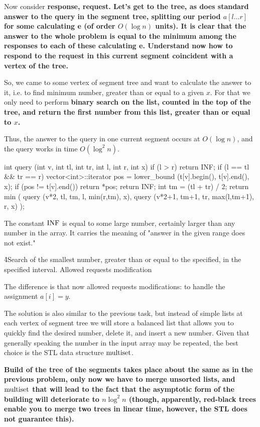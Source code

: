 Now consider \bf{response, request}. Let's get to the tree, as does standard answer to the query in the segment tree, splitting our period $a[l \ldots r]$ for some calculating e (of order $O (\log n)$ units). It is clear that the answer to the whole problem is equal to the minimum among the responses to each of these calculating e. Understand now how to respond to the request in this current segment coincident with a vertex of the tree.

So, we came to some vertex of segment tree and want to calculate the answer to it, i.e. to find minimum number, greater than or equal to a given $x$. For that we only need to perform \bf{binary search} on the list, counted in the top of the tree, and return the first number from this list, greater than or equal to $x$.

Thus, the answer to the query in one current segment occurs at $O (\log n)$, and the query works in time $O (\log^2 n)$.

\code
int query (int v, int tl, int tr, int l, int r, int x) {
if (l > r)
return INF;
if (l == tl && tr == r) {
vector<int>::iterator pos = lower_bound (t[v].begin(), t[v].end(), x);
if (pos != t[v].end())
return *pos;
return INF;
}
int tm = (tl + tr) / 2;
return min (
query (v*2, tl, tm, l, min(r,tm), x),
query (v*2+1, tm+1, tr, max(l,tm+1), r, x)
);
}
\endcode

The constant $\rm INF$ is equal to some large number, certainly larger than any number in the array. It carries the meaning of "answer in the given range does not exist."

\h4{Search of the smallest number, greater than or equal to the specified, in the specified interval. Allowed requests modification}

The difference is that now allowed requests modifications: to handle the assignment $a[i] = y$.

The solution is also similar to the previous task, but instead of simple lists at each vertex of segment tree we will store a balanced list that allows you to quickly find the desired number, delete it, and insert a new number. Given that generally speaking the number in the input array may be repeated, the best choice is the STL data structure $\rm multiset$.

\bf{Build} of the tree of the segments takes place about the same as in the previous problem, only now we have to merge unsorted lists, and $\rm multiset$ that will lead to the fact that the asymptotic form of the building will deteriorate to $n \log^2 n$ (though, apparently, red-black trees enable you to merge two trees in linear time, however, the STL does not guarantee this).

